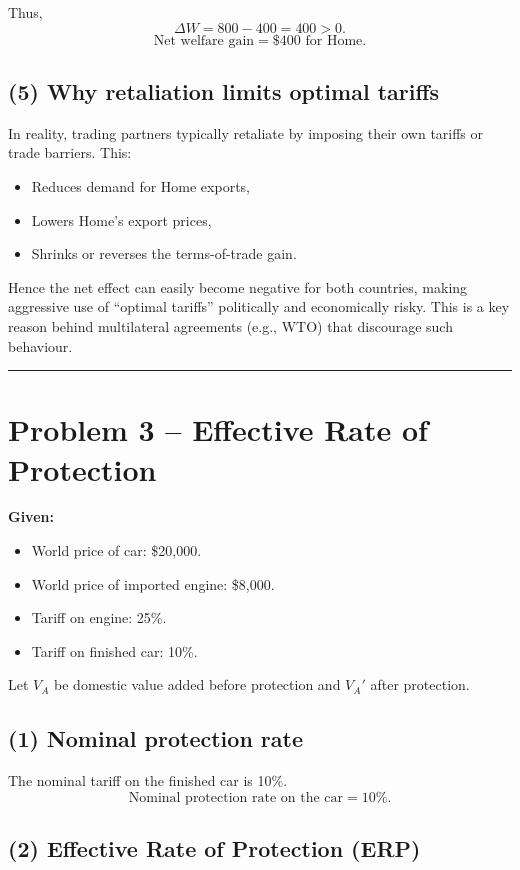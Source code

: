 \documentclass[12pt]{article}
\begin{document}
Thus,
\[
\Delta W = 800 - 400 = 400 > 0.
\]
\[
\boxed{\text{Net welfare gain} = \$400 \text{ for Home.}}
\]

\subsection*{(5) Why retaliation limits optimal tariffs}

In reality, trading partners typically retaliate by imposing their own tariffs or trade barriers. This:
\begin{itemize}
\item Reduces demand for Home exports,
\item Lowers Home’s export prices,
\item Shrinks or reverses the terms-of-trade gain.
\end{itemize}
Hence the net effect can easily become negative for both countries, making aggressive use of ``optimal tariffs'' politically and economically risky. This is a key reason behind multilateral agreements (e.g., WTO) that discourage such behaviour.

\bigskip
\hrule
\vspace{0.8em}

\section*{Problem 3 – Effective Rate of Protection}

\textbf{Given:}
\begin{itemize}
\item World price of car: \$20{,}000.
\item World price of imported engine: \$8{,}000.
\item Tariff on engine: 25\%.
\item Tariff on finished car: 10\%.
\end{itemize}

Let $V_A$ be domestic value added before protection and $V_A'$ after protection.

\subsection*{(1) Nominal protection rate}

The nominal tariff on the finished car is 10\%.  
\[
\boxed{\text{Nominal protection rate on the car} = 10\%.}
\]

\subsection*{(2) Effective Rate of Protection (ERP)}
\end{document}
